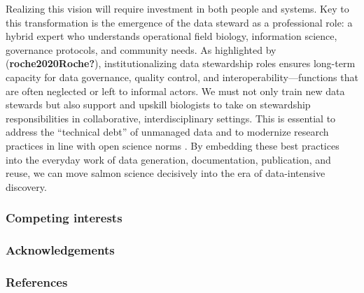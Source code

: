 \documentclass[
  letterpaper,
  DIV=11,
  numbers=noendperiod]{scrartcl}
\begin{document}
Realizing this vision will require investment in both people and
systems. Key to this transformation is the emergence of the data steward
as a professional role: a hybrid expert who understands operational
field biology, information science, governance protocols, and community
needs. As highlighted by (\textbf{roche2020Roche?}), institutionalizing
data stewardship roles ensures long-term capacity for data governance,
quality control, and interoperability---functions that are often
neglected or left to informal actors. We must not only train new data
stewards but also support and upskill biologists to take on stewardship
responsibilities in collaborative, interdisciplinary settings. This is
essential to address the ``technical debt'' of unmanaged data and to
modernize research practices in line with open science norms . By
embedding these best practices into the everyday work of data
generation, documentation, publication, and reuse, we can move salmon
science decisively into the era of data-intensive discovery.

\subsubsection{Competing interests}\label{competing-interests}

\subsubsection{Acknowledgements}\label{acknowledgements}

\subsubsection{References}\label{references}
\end{document}
